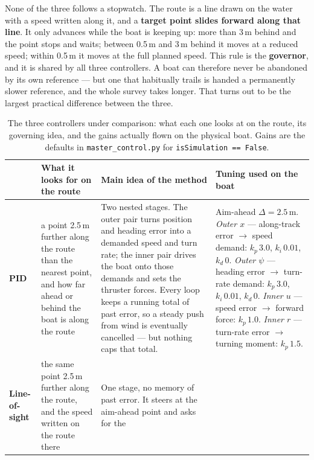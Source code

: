 \documentclass[11pt]{article}
\newcommand{\ctrl}[1]{\textbf{#1}}
\begin{document}
None of the three follows a stopwatch. The route is a line drawn on the water with a speed
written along it, and a \textbf{target point slides forward along that line}. It only
advances while the boat is keeping up: more than 3\,m behind and the point stops and waits;
between 0.5\,m and 3\,m behind it moves at a reduced speed; within 0.5\,m it moves at the full
planned speed. This rule is the \textbf{governor}, and it is shared by all three controllers.
A boat can therefore never be abandoned by its own reference --- but one that habitually
trails is handed a permanently slower reference, and the whole survey takes longer. That
turns out to be the largest practical difference between the three.

\begin{table}[H]
\centering
\caption{The three controllers under comparison: what each one looks at on the route, its
governing idea, and the gains actually flown on the physical boat. Gains are the defaults in
\texttt{master\_control.py} for \texttt{isSimulation == False}.}
\label{tab:controllers}
\small
\setlength{\tabcolsep}{4pt}
\begin{tabularx}{\linewidth}{@{} L{1.7cm} Y Y L{5.0cm} @{}}
\toprule
& \textbf{What it looks for on the route} & \textbf{Main idea of the method} & \textbf{Tuning used on the boat} \\
\midrule
\ctrl{PID} &
a point 2.5\,m further along the route than the nearest point, and how far ahead or behind
the boat is along the route &
Two nested stages. The outer pair turns position and heading error into a demanded speed and
turn rate; the inner pair drives the boat onto those demands and sets the thruster forces.
Every loop keeps a running total of past error, so a steady push from wind is eventually
cancelled --- but nothing caps that total. &
Aim-ahead $\Delta = 2.5$\,m.\newline
\emph{Outer $x$} --- along-track error $\to$ speed demand: $k_p\,3.0$, $k_i\,0.01$,
$k_d\,0$.\newline
\emph{Outer $\psi$} --- heading error $\to$ turn-rate demand: $k_p\,3.0$, $k_i\,0.01$,
$k_d\,0$.\newline
\emph{Inner $u$} --- speed error $\to$ forward force: $k_p\,1.0$.\newline
\emph{Inner $r$} --- turn-rate error $\to$ turning moment: $k_p\,1.5$. \\
\addlinespace
\ctrl{Line-of-sight} &
the same point 2.5\,m further along the route, and the speed written on the route there &
One stage, no memory of past error. It steers at the aim-ahead point and asks for the

\end{tabularx}
\end{table}
\end{document}
